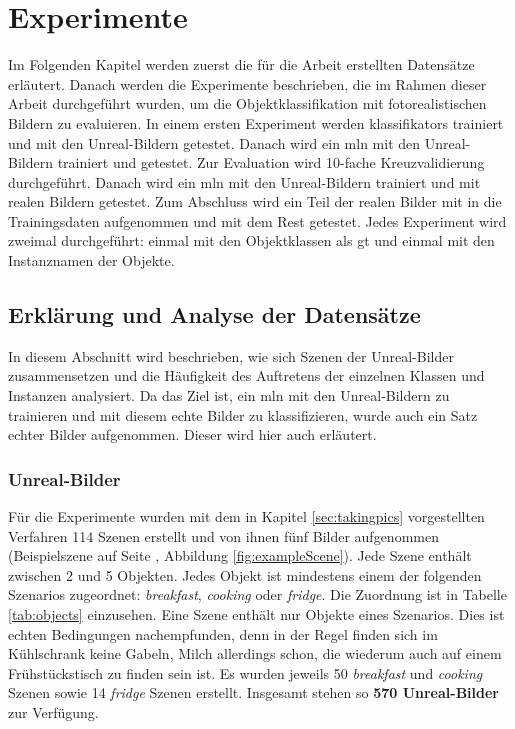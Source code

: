 \graphicspath{{./images/}}      
\def\CHAPTERONE{./chapters/Chapter-1} 

\chapter{Experimente}
\label{chap:experiments}
%	
\glsresetall
Im Folgenden Kapitel werden zuerst die für die Arbeit erstellten Datensätze erläutert. Danach werden die Experimente beschrieben, die im Rahmen dieser Arbeit durchgeführt wurden, um die Objektklassifikation mit fotorealistischen Bildern zu evaluieren. \newline
In einem ersten Experiment werden \glspl{klassifikator} trainiert und mit den Unreal-Bildern getestet. Danach wird ein \gls{mln} mit den Unreal-Bildern trainiert und getestet. Zur Evaluation wird 10-fache Kreuzvalidierung durchgeführt. Danach wird ein \gls{mln} mit den Unreal-Bildern trainiert und mit realen Bildern getestet. Zum Abschluss wird ein Teil der realen Bilder mit in die Trainingsdaten aufgenommen und mit dem Rest getestet. Jedes Experiment wird zweimal durchgeführt: einmal mit den Objektklassen als \gls{gt} und einmal mit den Instanznamen der Objekte. 

\section{Erklärung und Analyse der Datensätze}

In diesem Abschnitt wird beschrieben, wie sich Szenen der Unreal-Bilder zusammensetzen und die Häufigkeit des Auftretens der einzelnen Klassen und Instanzen analysiert. Da das Ziel ist, ein \gls{mln} mit den Unreal-Bildern zu trainieren und mit diesem echte Bilder zu klassifizieren, wurde auch ein Satz echter Bilder aufgenommen. Dieser wird hier auch erläutert.

\subsection{Unreal-Bilder}  
Für die Experimente wurden mit dem in Kapitel \ref{sec:takingpics} vorgestellten Verfahren 114 Szenen erstellt und von ihnen fünf Bilder aufgenommen (Beispielszene auf Seite \pageref{fig:exampleScene}, Abbildung \ref{fig:exampleScene}). Jede Szene enthält zwischen 2 und 5 Objekten. Jedes Objekt ist mindestens einem der folgenden Szenarios zugeordnet: \textit{breakfast}, \textit{cooking} oder \textit{fridge}. Die Zuordnung ist in Tabelle \ref{tab:objects} einzusehen. Eine Szene enthält nur Objekte eines Szenarios. Dies ist echten Bedingungen nachempfunden, denn in der Regel finden sich im Kühlschrank keine Gabeln, Milch allerdings schon, die wiederum auch auf einem Frühstückstisch zu finden sein ist. Es wurden jeweils 50 \textit{breakfast} und \textit{cooking} Szenen sowie 14 \textit{fridge} Szenen erstellt. Insgesamt stehen so \textbf{570 Unreal-Bilder} zur Verfügung. \par

